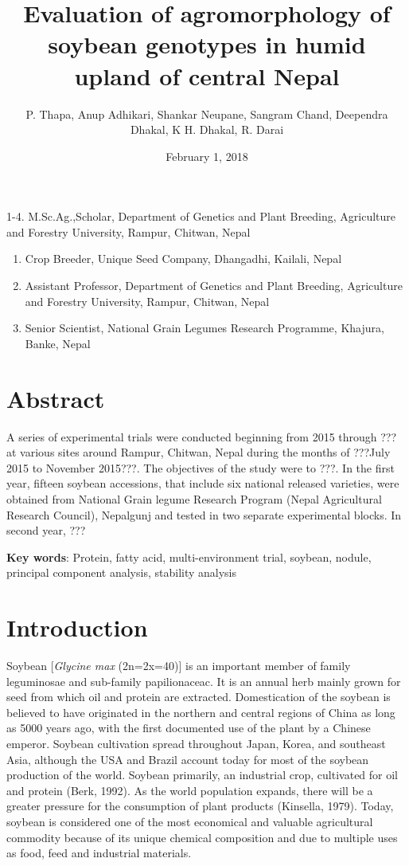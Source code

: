 \documentclass[
]{article}
\title{Evaluation of agromorphology of soybean genotypes in humid upland of central Nepal}
\author{P. Thapa, Anup Adhikari, Shankar Neupane, Sangram Chand, Deependra Dhakal, K H. Dhakal, R. Darai}
\date{February 1, 2018}
\begin{document}
\maketitle

{
\setcounter{tocdepth}{3}
\tableofcontents
}
1-4. M.Sc.Ag.,Scholar, Department of Genetics and Plant Breeding, Agriculture and Forestry University, Rampur, Chitwan, Nepal

\begin{enumerate}
\def\labelenumi{\arabic{enumi}.}
\setcounter{enumi}{4}
\item
  Crop Breeder, Unique Seed Company, Dhangadhi, Kailali, Nepal
\item
  Assistant Professor, Department of Genetics and Plant Breeding, Agriculture and Forestry University, Rampur, Chitwan, Nepal
\item
  Senior Scientist, National Grain Legumes Research Programme, Khajura, Banke, Nepal
\end{enumerate}

\hypertarget{abstract}{%
\section{Abstract}\label{abstract}}

A series of experimental trials were conducted beginning from 2015 through ??? at various sites around Rampur, Chitwan, Nepal during the months of ???July 2015 to November 2015???. The objectives of the study were to ???. In the first year, fifteen soybean accessions, that include six national released varieties, were obtained from National Grain legume Research Program (Nepal Agricultural Research Council), Nepalgunj and tested in two separate experimental blocks. In second year, ???

\textbf{Key words}: Protein, fatty acid, multi-environment trial, soybean, nodule, principal component analysis, stability analysis

\hypertarget{introduction}{%
\section{Introduction}\label{introduction}}

Soybean {[}\emph{Glycine max} (2n=2x=40){]} is an important member of family leguminosae and sub-family papilionaceac. It is an annual herb mainly grown for seed from which oil and protein are extracted. Domestication of the soybean is believed to have originated in the northern and central regions of China as long as 5000 years ago, with the first documented use of the plant by a Chinese emperor. Soybean cultivation spread throughout Japan, Korea, and southeast Asia, although the USA and Brazil account today for most of the soybean production of the world. Soybean primarily, an industrial crop, cultivated for oil and protein (Berk, 1992). As the world population expands, there will be a greater pressure for the consumption of plant products (Kinsella, 1979). Today, soybean is considered one of the most economical and valuable agricultural commodity because of its unique chemical composition and due to multiple uses as food, feed and industrial materials.
\end{document}
